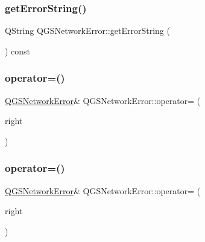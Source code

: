 \mbox{\label{class_q_g_s_network_error_ab90300ae16b03887c34e498dfbd5b688}} 
\subsubsection{\texorpdfstring{get\+Error\+String()}{getErrorString()}}
{\footnotesize\ttfamily Q\+String Q\+G\+S\+Network\+Error\+::get\+Error\+String (\begin{DoxyParamCaption}{ }\end{DoxyParamCaption}) const}

\mbox{\label{class_q_g_s_network_error_a92a4a2258f506fcf68f8bc626f68ba8f}} 
\subsubsection{\texorpdfstring{operator=()}{operator=()}\hspace{0.1cm}{\footnotesize\ttfamily [1/2]}}
{\footnotesize\ttfamily \mbox{\hyperlink{class_q_g_s_network_error}{Q\+G\+S\+Network\+Error}}\& Q\+G\+S\+Network\+Error\+::operator= (\begin{DoxyParamCaption}\item[{const \mbox{\hyperlink{class_q_g_s_network_error}{Q\+G\+S\+Network\+Error}} \&}]{right }\end{DoxyParamCaption})\hspace{0.3cm}{\ttfamily [default]}}

\mbox{\label{class_q_g_s_network_error_ab864b5cd7be91694ccc4650a77e44004}} 
\subsubsection{\texorpdfstring{operator=()}{operator=()}\hspace{0.1cm}{\footnotesize\ttfamily [2/2]}}
{\footnotesize\ttfamily \mbox{\hyperlink{class_q_g_s_network_error}{Q\+G\+S\+Network\+Error}}\& Q\+G\+S\+Network\+Error\+::operator= (\begin{DoxyParamCaption}\item[{\mbox{\hyperlink{class_q_g_s_network_error}{Q\+G\+S\+Network\+Error}} \&\&}]{right }\end{DoxyParamCaption})\hspace{0.3cm}{\ttfamily [default]}}



